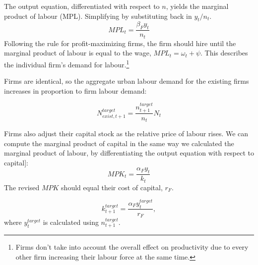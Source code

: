 The output equation, differentiated with respect to  $n$, yields the marginal product of labour (MPL). Simplifying by substituting back in $y_t/n_t$. %
\begin{equation}MPL_{t} = \frac{\beta_{F}{y}_{t}} {n_t} \label{eqn-urban-firm-mpl}
\end{equation} 
Following the rule for profit-maximizing firms, the firm should hire until the marginal product of labour is equal to the wage, $MPL_t= {\omega_t + \psi}$. This describes the individual firm's demand  for labour.\footnote{Firms  don't take into account the overall effect on  productivity due to every other firm increasing their labour force at the same time. } 

Firms are identical, so the aggregate urban labour demand for  the existing firms increases in proportion to firm labour demand:

\begin{equation}N_{exist,t+1}^{target} = \frac{n^{target}_{t+1}}{n_{t}} N_t\end{equation}   


Firms also adjust their capital stock as the relative price of labour rises. We can compute the marginal product of capital in the same way we calculated the marginal product of labour, by differentiating the output equation with respect to capital]:
\begin{equation} MPK_t = \frac{\alpha_{F}{y}_{t}}{k_{t}} \label{eqn-urban-firm-mpk}
\end{equation} 
The revised $MPK$ should equal their cost of capital, $r_F$. %

\begin{equation}k_{t+1}^{target}= \frac{\alpha_{F}{y}^{target}_{t}}{r_F},\end{equation}
where  $y_t^{target}$  is calculated using $n^{target}_{t+1}$. %






